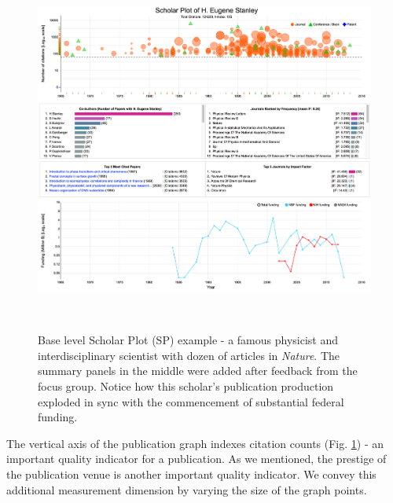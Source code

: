 \begin{figure}
    \centering
    \includegraphics[width=1\textwidth]{figures/fig-EugeneStanley}
    \caption{Base level Scholar Plot (SP) example - a famous physicist and interdisciplinary scientist with dozen of articles in \emph{Nature}. The summary panels in the middle were added after feedback from the focus group. Notice how this scholar's publication production exploded in sync with the commencement of substantial federal funding.}~\label{fig:ScholarPlot} 
\end{figure} 

The vertical axis of the publication graph indexes citation counts (Fig. \ref{fig:ScholarPlot}) - an important quality indicator for a publication. As we mentioned, the prestige of the publication venue is another important quality indicator. We convey this additional measurement dimension by varying the size of the graph points. 

